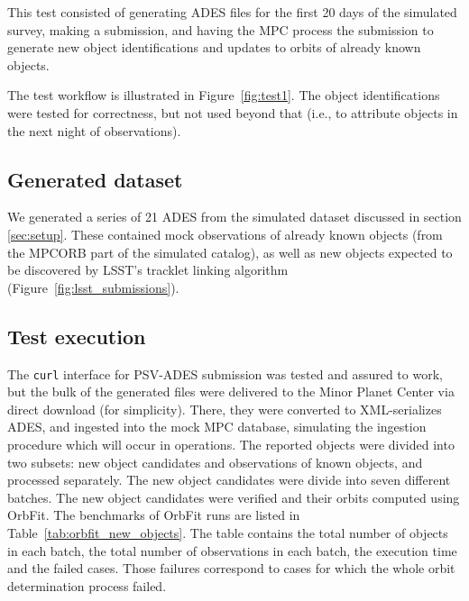 This test consisted of generating ADES files for the first 20 days of the simulated survey, making a submission, and having the MPC process the submission to generate new object identifications and updates to orbits of already known objects.

The test workflow is illustrated in Figure~\ref{fig:test1}. The object identifications were tested for correctness, but not used beyond that (i.e., to attribute objects in the next night of observations).

\subsection{Generated dataset}


We generated a series of 21 ADES from the simulated dataset discussed in section \ref{sec:setup}. These contained mock observations of already known objects (from the MPCORB part of the simulated catalog), as well as new objects expected to be discovered by LSST's tracklet linking algorithm (Figure~\ref{fig:lsst_submissions}).

\subsection{Test execution}

The {\tt curl} interface for PSV-ADES submission was tested and assured to work, but the bulk of the generated files were delivered to the Minor Planet Center via direct download (for simplicity). There, they were converted to XML-serializes ADES, and ingested into the mock MPC database, simulating the ingestion procedure which will occur in operations. The reported objects were divided into two subsets: new object candidates and observations of known objects, and processed separately. The new object candidates were divide into seven different batches. The new object candidates were verified and their orbits computed using OrbFit. The benchmarks of OrbFit runs are listed in Table~\ref{tab:orbfit_new_objects}. The table contains the total number of objects in each batch, the total number of observations in each batch, the execution time and the failed cases. Those failures correspond to cases for which the whole orbit determination process failed.

